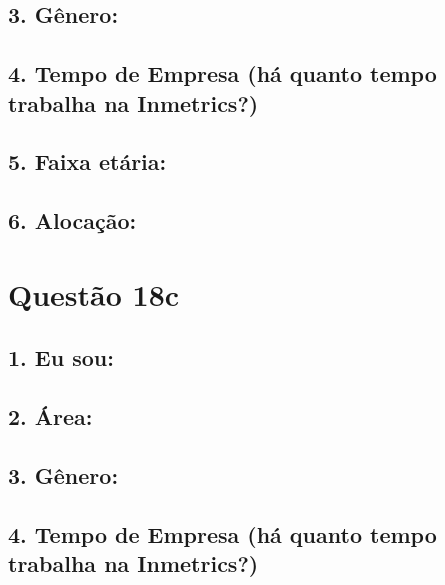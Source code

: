 \documentclass[]{book}
\begin{document}
\hypertarget{genero-41}{%
\subsection{3. Gênero:}\label{genero-41}}

\hypertarget{tempo-de-empresa-ha-quanto-tempo-trabalha-na-inmetrics-41}{%
\subsection{4. Tempo de Empresa (há quanto tempo trabalha na Inmetrics?)}\label{tempo-de-empresa-ha-quanto-tempo-trabalha-na-inmetrics-41}}

\hypertarget{faixa-etaria-41}{%
\subsection{5. Faixa etária:}\label{faixa-etaria-41}}

\hypertarget{alocacao-41}{%
\subsection{6. Alocação:}\label{alocacao-41}}

\hypertarget{questao-18c}{%
\section{Questão 18c}\label{questao-18c}}

\hypertarget{eu-sou-42}{%
\subsection{1. Eu sou:}\label{eu-sou-42}}

\hypertarget{area-42}{%
\subsection{2. Área:}\label{area-42}}

\hypertarget{genero-42}{%
\subsection{3. Gênero:}\label{genero-42}}

\hypertarget{tempo-de-empresa-ha-quanto-tempo-trabalha-na-inmetrics-42}{%
\subsection{4. Tempo de Empresa (há quanto tempo trabalha na Inmetrics?)}\label{tempo-de-empresa-ha-quanto-tempo-trabalha-na-inmetrics-42}}
\end{document}
